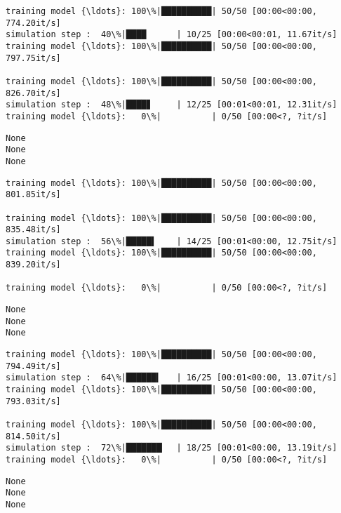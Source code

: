 \documentclass[11pt]{article}
\begin{document}
    \begin{Verbatim}[commandchars=\\\{\}]
training model {\ldots}: 100\%|██████████| 50/50 [00:00<00:00, 774.20it/s]
simulation step :  40\%|████      | 10/25 [00:00<00:01, 11.67it/s]
training model {\ldots}: 100\%|██████████| 50/50 [00:00<00:00, 797.75it/s]

training model {\ldots}: 100\%|██████████| 50/50 [00:00<00:00, 826.70it/s]
simulation step :  48\%|████▊     | 12/25 [00:01<00:01, 12.31it/s]
training model {\ldots}:   0\%|          | 0/50 [00:00<?, ?it/s]
    \end{Verbatim}

    \begin{Verbatim}[commandchars=\\\{\}]
None
None
None
    \end{Verbatim}

    \begin{Verbatim}[commandchars=\\\{\}]
training model {\ldots}: 100\%|██████████| 50/50 [00:00<00:00, 801.85it/s]

training model {\ldots}: 100\%|██████████| 50/50 [00:00<00:00, 835.48it/s]
simulation step :  56\%|█████▌    | 14/25 [00:01<00:00, 12.75it/s]
training model {\ldots}: 100\%|██████████| 50/50 [00:00<00:00, 839.20it/s]

training model {\ldots}:   0\%|          | 0/50 [00:00<?, ?it/s]
    \end{Verbatim}

    \begin{Verbatim}[commandchars=\\\{\}]
None
None
None
    \end{Verbatim}

    \begin{Verbatim}[commandchars=\\\{\}]
training model {\ldots}: 100\%|██████████| 50/50 [00:00<00:00, 794.49it/s]
simulation step :  64\%|██████▍   | 16/25 [00:01<00:00, 13.07it/s]
training model {\ldots}: 100\%|██████████| 50/50 [00:00<00:00, 793.03it/s]

training model {\ldots}: 100\%|██████████| 50/50 [00:00<00:00, 814.50it/s]
simulation step :  72\%|███████▏  | 18/25 [00:01<00:00, 13.19it/s]
training model {\ldots}:   0\%|          | 0/50 [00:00<?, ?it/s]
    \end{Verbatim}

    \begin{Verbatim}[commandchars=\\\{\}]
None
None
None
    \end{Verbatim}
\end{document}
